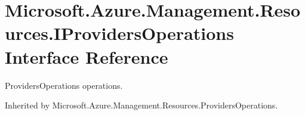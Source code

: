 \hypertarget{interface_microsoft_1_1_azure_1_1_management_1_1_resources_1_1_i_providers_operations}{}\section{Microsoft.\+Azure.\+Management.\+Resources.\+I\+Providers\+Operations Interface Reference}
\label{interface_microsoft_1_1_azure_1_1_management_1_1_resources_1_1_i_providers_operations}


Providers\+Operations operations.  




Inherited by Microsoft.\+Azure.\+Management.\+Resources.\+Providers\+Operations.

